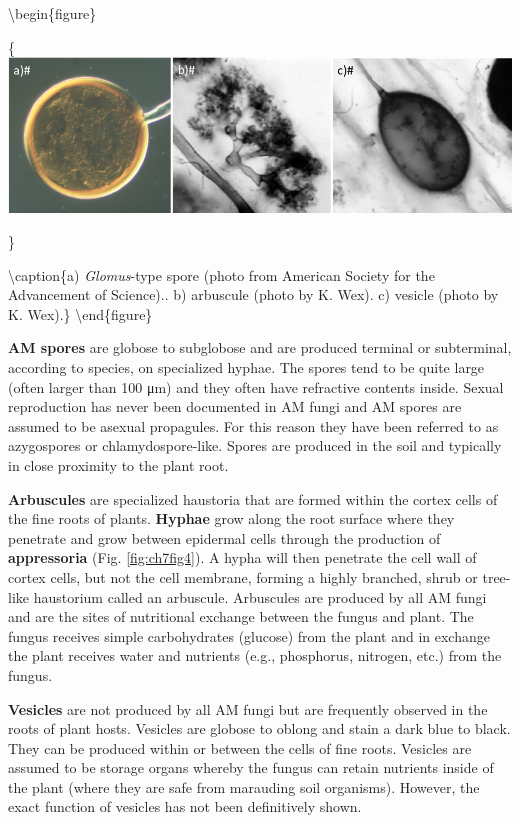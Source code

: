 \documentclass[]{book}
\begin{document}
\textbackslash begin\{figure\}

\{\centering \includegraphics[width=12.99in]{img/Ch7_Fig1}

\}

\textbackslash caption\{a) \emph{Glomus}-type spore (photo from American Society for the Advancement of Science).. b) arbuscule (photo by K. Wex). c) vesicle (photo by K. Wex).\}\label{fig:ch7fig1}
\textbackslash end\{figure\}

\textbf{AM spores} are globose to subglobose and are produced terminal or subterminal, according to species, on specialized hyphae. The spores tend to be quite large (often larger than 100 μm) and they often have refractive contents inside. Sexual reproduction has never been documented in AM fungi and AM spores are assumed to be asexual propagules. For this reason they have been referred to as azygospores or chlamydospore-like. Spores are produced in the soil and typically in close proximity to the plant root.

\textbf{Arbuscules} are specialized haustoria that are formed within the cortex cells of the fine roots of plants. \textbf{Hyphae} grow along the root surface where they penetrate and grow between epidermal cells through the production of \textbf{appressoria} (Fig. \ref{fig:ch7fig4}). A hypha will then penetrate the cell wall of cortex cells, but not the cell membrane, forming a highly branched, shrub or tree-like haustorium called an arbuscule. Arbuscules are produced by all AM fungi and are the sites of nutritional exchange between the fungus and plant. The fungus receives simple carbohydrates (glucose) from the plant and in exchange the plant receives water and nutrients (e.g., phosphorus, nitrogen, etc.) from the fungus.

\textbf{Vesicles} are not produced by all AM fungi but are frequently observed in the roots of plant hosts. Vesicles are globose to oblong and stain a dark blue to black. They can be produced within or between the cells of fine roots. Vesicles are assumed to be storage organs whereby the fungus can retain nutrients inside of the plant (where they are safe from marauding soil organisms). However, the exact function of vesicles has not been definitively shown.
\end{document}
